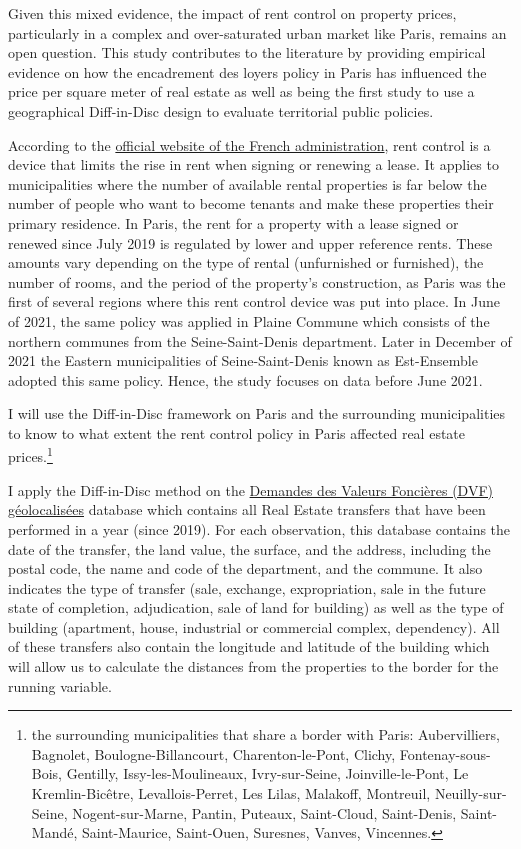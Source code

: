 \documentclass[12pt]{article}
\theoremstyle{plain}
\theoremstyle{remark}
\begin{document}
Given this mixed evidence, the impact of rent control on property prices, particularly in a complex and over-saturated urban market like Paris, remains an open question. This study contributes to the literature by providing empirical evidence on how the encadrement des loyers policy in Paris has influenced the price per square meter of real estate as well as being the first study to use a geographical Diff-in-Disc design to evaluate territorial public policies.

 According to the \href{https://www.service-public.fr/particuliers/vosdroits/F1314}{official website of the French administration}, rent control is a device that limits the rise in rent when signing or renewing a lease. It applies to municipalities where the number of available rental properties is far below the number of people who want to become tenants and make these properties their primary residence. In Paris, the rent for a property with a lease signed or renewed since July 2019 is regulated by lower and upper reference rents. These amounts vary depending on the type of rental (unfurnished or furnished), the number of rooms, and the period of the property's construction, as Paris was the first of several regions where this rent control device was put into place. In June of 2021, the same policy was applied in Plaine Commune which consists of the northern communes from the Seine-Saint-Denis department. Later in December of 2021 the Eastern municipalities of Seine-Saint-Denis known as Est-Ensemble adopted this same policy. Hence, the study focuses on data before June 2021.
 
 I will use the Diff-in-Disc framework on Paris and the surrounding municipalities to know to what extent the rent control policy in Paris affected real estate prices.\footnote{the surrounding municipalities that share a border with Paris: Aubervilliers, Bagnolet, Boulogne-Billancourt, Charenton-le-Pont, Clichy, Fontenay-sous-Bois, Gentilly, Issy-les-Moulineaux, Ivry-sur-Seine, Joinville-le-Pont, Le Kremlin-Bicêtre, Levallois-Perret, Les Lilas, Malakoff, Montreuil, Neuilly-sur-Seine, Nogent-sur-Marne, Pantin, Puteaux, Saint-Cloud, Saint-Denis, Saint-Mandé, Saint-Maurice, Saint-Ouen, Suresnes, Vanves, Vincennes.} 

 I apply the Diff-in-Disc method on the \href{https://www.data.gouv.fr/fr/datasets/demandes-de-valeurs-foncieres-geolocalisees/#/resources}{Demandes des Valeurs Foncières (DVF) géolocalisées} database which contains all Real Estate transfers that have been performed in a year (since 2019). For each observation, this database contains the date of the transfer, the land value, the surface, and the address, including the postal code, the name and code of the department, and the commune. It also indicates the type of transfer (sale, exchange, expropriation, sale in the future state of completion, adjudication, sale of land for building) as well as the type of building (apartment, house, industrial or commercial complex, dependency). All of these transfers also contain the longitude and latitude of the building which will allow us to calculate the distances from the properties to the border for the running variable. 
 
\end{document}
